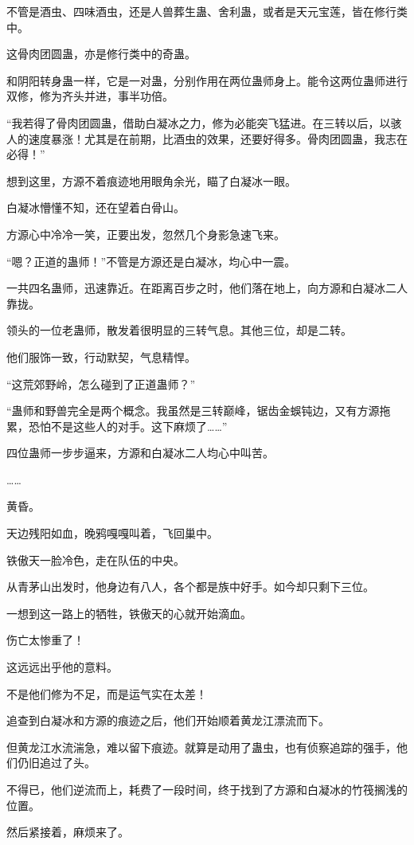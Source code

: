 \begin{this_body}
不管是酒虫、四味酒虫，还是人兽葬生蛊、舍利蛊，或者是天元宝莲，皆在修行类中。

这骨肉团圆蛊，亦是修行类中的奇蛊。

和阴阳转身蛊一样，它是一对蛊，分别作用在两位蛊师身上。能令这两位蛊师进行双修，修为齐头并进，事半功倍。

“我若得了骨肉团圆蛊，借助白凝冰之力，修为必能突飞猛进。在三转以后，以骇人的速度暴涨！尤其是在前期，比酒虫的效果，还要好得多。骨肉团圆蛊，我志在必得！”

想到这里，方源不着痕迹地用眼角余光，瞄了白凝冰一眼。

白凝冰懵懂不知，还在望着白骨山。

方源心中冷冷一笑，正要出发，忽然几个身影急速飞来。

“嗯？正道的蛊师！”不管是方源还是白凝冰，均心中一震。

一共四名蛊师，迅速靠近。在距离百步之时，他们落在地上，向方源和白凝冰二人靠拢。

领头的一位老蛊师，散发着很明显的三转气息。其他三位，却是二转。

他们服饰一致，行动默契，气息精悍。

“这荒郊野岭，怎么碰到了正道蛊师？”

“蛊师和野兽完全是两个概念。我虽然是三转巅峰，锯齿金蜈钝边，又有方源拖累，恐怕不是这些人的对手。这下麻烦了……”

四位蛊师一步步逼来，方源和白凝冰二人均心中叫苦。

……

黄昏。

天边残阳如血，晚鸦嘎嘎叫着，飞回巢中。

铁傲天一脸冷色，走在队伍的中央。

从青茅山出发时，他身边有八人，各个都是族中好手。如今却只剩下三位。

一想到这一路上的牺牲，铁傲天的心就开始滴血。

伤亡太惨重了！

这远远出乎他的意料。

不是他们修为不足，而是运气实在太差！

追查到白凝冰和方源的痕迹之后，他们开始顺着黄龙江漂流而下。

但黄龙江水流湍急，难以留下痕迹。就算是动用了蛊虫，也有侦察追踪的强手，他们仍旧追过了头。

不得已，他们逆流而上，耗费了一段时间，终于找到了方源和白凝冰的竹筏搁浅的位置。

然后紧接着，麻烦来了。


\end{this_body}
